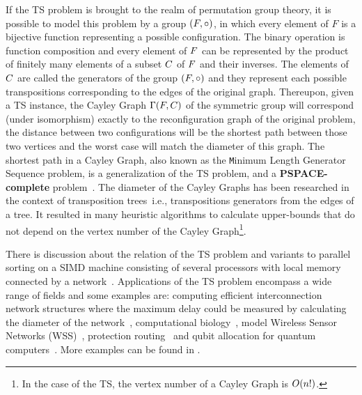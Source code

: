 \documentclass[msc]{ppgccufmg}    %
\begin{document}
If the TS problem is brought to the realm of permutation group theory, it is
possible to model this problem by a group $(F,\circ)$, in which every element 
of $F$ is a bijective function representing a possible configuration. 
The binary operation is function composition and every element of $F$ 
can be represented by the product of finitely many elements of a subset 
$C$ of $F$ and their inverses.
The elements of $C$ are called the generators of the group $(F,\circ)$ 
and they represent each possible transpositions corresponding to the edges 
of the original graph.
Thereupon, given a TS instance, the Cayley Graph $\Gamma(F,C)$ of the symmetric 
group will correspond (under isomorphism) exactly to the reconfiguration graph 
of the original problem, the distance between two configurations will be the 
shortest path between those two vertices and the worst case will match the 
diameter of this graph.
The shortest path in a Cayley Graph, also known as the {\texttt Minimum Length
Generator Sequence} problem, is a generalization of the TS problem, and a 
\textbf{PSPACE-complete} problem~\citep{Jerrum:1985}.
The diameter of the Cayley Graphs has been researched in the context of 
transposition trees~\citep{Akers:1989, Cooperman:1992,
Bafna:1998,Ganesan:Diameter:2012, Ganesan:Strictness:2012,Chitturi:2013,
Kraft:2015,Chitturi:2019}\textemdash i.e., transpositions generators from the 
edges of a tree.
It resulted in many heuristic algorithms to calculate upper-bounds that
do not depend on the vertex number of the Cayley Graph\footnote{In the case of
the TS, the vertex number of a Cayley Graph is $O(n!)$.}.


There is discussion about the relation of the TS problem and variants 
to parallel sorting on a SIMD machine consisting of several processors with
local memory connected by a network~\citep{Yamanaka:2015,Kawahara:2017}. 
Applications of the TS problem encompass a wide range of fields and some 
examples are: computing efficient interconnection network structures where the 
maximum delay could be measured by calculating the diameter of the 
network~\citep{Annexstein:1990}, computational biology~\citep
{Bafna:1998,Lenwood:2003}, model Wireless Sensor Networks (WSS)~\citep
{Wang:2007}, protection routing~\citep{Pai:2020} and qubit allocation for 
quantum computers~\citep{Siraichi:2018,Siraichi:2019}.
More examples can be found in \cite{Oswin:2021}.
\end{document}
